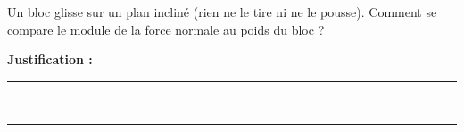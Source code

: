 Un bloc glisse sur un plan incliné (rien ne le tire ni ne le pousse). Comment se compare le module de la force normale au poids du bloc ?

\choices

\noindent\textbf{Justification :} \hrulefill \\[2.5ex]
\rule{\linewidth}{0.4pt} \\[2.5ex]
\rule{\linewidth}{0.4pt}
\vfill
